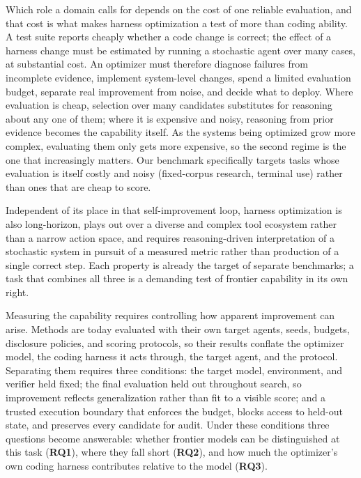 Which role a domain calls for depends on the cost of one reliable evaluation,
and that cost is what makes harness optimization a test of more than coding
ability. A test suite reports cheaply whether a code change is correct; the
effect of a harness change must be estimated by running a stochastic agent over
many cases, at substantial cost. An optimizer must therefore diagnose
failures from incomplete evidence, implement system-level changes, spend a
limited evaluation budget, separate real improvement from noise, and decide what
to deploy. Where evaluation is cheap, selection over many candidates substitutes
for reasoning about any one of them; where it is expensive and noisy, reasoning
from prior evidence becomes the capability itself. As the systems being
optimized grow more complex, evaluating them only gets more expensive, so the
second regime is the one that increasingly matters. Our
benchmark specifically targets tasks whose evaluation is itself costly and noisy (fixed-corpus
research, terminal use) rather than ones that are cheap to score.

Independent of its place in that self-improvement loop, harness optimization
is also long-horizon, plays out over a diverse and complex tool ecosystem
rather than a narrow action space, and requires reasoning-driven
interpretation of a stochastic system in pursuit of a measured metric rather
than production of a single correct step. Each property is already the
target of separate benchmarks; a task that combines all three is a demanding
test of frontier capability in its own right.

Measuring the capability requires controlling how apparent improvement can
arise. Methods are today evaluated with their own target agents, seeds, budgets,
disclosure policies, and scoring protocols, so their results conflate the
optimizer model, the coding harness it acts through, the target agent, and the
protocol. Separating them requires three conditions: the target model,
environment, and verifier held fixed; the final evaluation held out throughout
search, so improvement reflects generalization rather than fit to a visible
score; and a trusted execution boundary that enforces the budget, blocks access
to held-out state, and preserves every candidate for audit. Under these
conditions three questions become answerable: whether frontier models can be
distinguished at this task (\textbf{RQ1}), where they fall short
(\textbf{RQ2}), and how much the optimizer's own coding harness contributes
relative to the model (\textbf{RQ3}).

